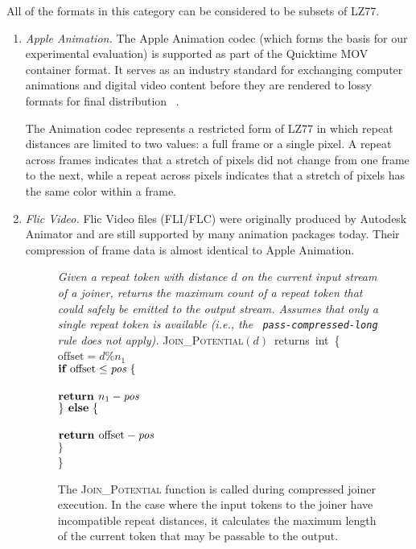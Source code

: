 All of the formats in this category can be considered to be subsets of
LZ77.

\begin{enumerate}

\item {\it Apple Animation.}  The Apple Animation codec (which forms
  the basis for our experimental evaluation) is supported as part of
  the Quicktime MOV container format.  It serves as an industry
  standard for exchanging computer animations and digital video
  content before they are rendered to lossy formats for final
  distribution~\cite[p.~106]{adobe-anim}\cite[p.~284]{harrington-anim}
  \cite[p.~367]{long-anim}\cite[p.~280]{pogue-anim}.

The Animation codec represents a restricted form of LZ77 in which
repeat distances are limited to two values: a full frame or a single
pixel.  A repeat across frames indicates that a stretch of pixels did
not change from one frame to the next, while a repeat across pixels
indicates that a stretch of pixels has the same color within a frame.

\item {\it Flic Video.}
Flic Video files (FLI/FLC) were originally produced by Autodesk
Animator and are still supported by many animation packages today.
Their compression of frame data is almost identical to Apple
Animation.

\begin{figure}[t]
\centering
\begin{minipage}{0.75\textwidth}
{\it Given a repeat token with distance $d$ on the current input
  stream of a joiner, returns the maximum count of a repeat token that
  could safely be emitted to the output stream.  Assumes that only a
  single repeat token is available (i.e., the {\tt
    pass-compressed-long} rule does not apply).}
\textsc{Join\_Potential}$(d)$~returns~int~\{\\ \tab$\mbox{offset} =
d$\%$n_1$\\ \tab$\mbox{{\bf if~}} \mbox{offset} \leq \mbox{\it pos}
~\{$\\ \tab{}\\ \tab\tab$\mbox{\bf return~} n_1 - \mbox{\it pos}$\\ \tab$\} \mbox{\bf
  ~else} ~\{$\\ \tab{}\\ \tab\tab$\mbox{\bf return~} \mbox{offset} -
\mbox{\it pos}$\\ \tab$\}$\\ \}
\end{minipage}
\caption[\textsc{Join\_Potential} function for compressed joiner
  execution]{The \textsc{Join\_Potential} function is called during
  compressed joiner execution.  In the case where the input tokens to
  the joiner have incompatible repeat distances, it calculates the
  maximum length of the current token that may be passable to the
  output. \protect\label{fig:join-potential}}
\end{figure}


\end{enumerate}
